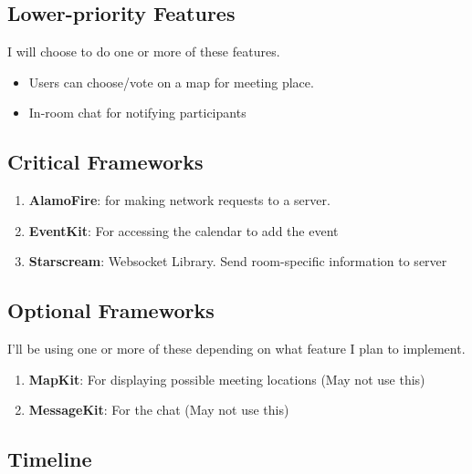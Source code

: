\documentclass[11pt]{article}
\begin{document}
\subsection{Lower-priority Features}
\label{sec:org10cc877}

I will choose to do one or more of these features.

\begin{itemize}
\item Users can choose/vote on a map for meeting place.
\item In-room chat for notifying participants
\end{itemize}

\subsection{Critical Frameworks}
\label{sec:org983003b}

\begin{enumerate}
\item \textbf{AlamoFire}: for making network requests to a server.
\item \textbf{EventKit}: For accessing the calendar to add the event
\item \textbf{Starscream}: Websocket Library. Send room-specific information to server
\end{enumerate}

\subsection{Optional Frameworks}
\label{sec:org96b4f1d}

I'll be using one or more of these depending on what feature I plan to implement. 

\begin{enumerate}
\item \textbf{MapKit}: For displaying possible meeting locations (May not use this)
\item \textbf{MessageKit}: For the chat (May not use this)
\end{enumerate}


\subsection{Timeline}
\label{sec:orgbdeacf6}
\end{document}
